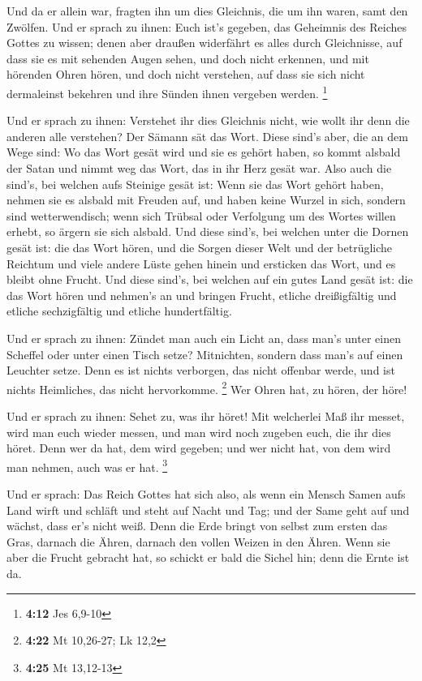  Und da er allein war, fragten ihn um dies Gleichnis, die
um ihn waren, samt den Zwölfen.  Und er sprach zu ihnen:
Euch ist's gegeben, das Geheimnis des Reiches Gottes zu wissen; denen
aber draußen widerfährt es alles durch Gleichnisse,  auf
dass sie es mit sehenden Augen sehen, und doch nicht erkennen, und mit
hörenden Ohren hören, und doch nicht verstehen, auf dass sie sich nicht
dermaleinst bekehren und ihre Sünden ihnen vergeben werden. \footnote{\textbf{4:12}
  Jes 6,9-10}

 Und er sprach zu ihnen: Verstehet ihr dies Gleichnis
nicht, wie wollt ihr denn die anderen alle verstehen?  Der
Sämann sät das Wort.  Diese sind's aber, die an dem Wege
sind: Wo das Wort gesät wird und sie es gehört haben, so kommt alsbald
der Satan und nimmt weg das Wort, das in ihr Herz gesät war.
 Also auch die sind's, bei welchen aufs Steinige gesät ist:
Wenn sie das Wort gehört haben, nehmen sie es alsbald mit Freuden auf,
 und haben keine Wurzel in sich, sondern sind
wetterwendisch; wenn sich Trübsal oder Verfolgung um des Wortes willen
erhebt, so ärgern sie sich alsbald.  Und diese sind's, bei
welchen unter die Dornen gesät ist: die das Wort hören, 
und die Sorgen dieser Welt und der betrügliche Reichtum und viele andere
Lüste gehen hinein und ersticken das Wort, und es bleibt ohne Frucht.
 Und diese sind's, bei welchen auf ein gutes Land gesät
ist: die das Wort hören und nehmen's an und bringen Frucht, etliche
dreißigfältig und etliche sechzigfältig und etliche hundertfältig.

 Und er sprach zu ihnen: Zündet man auch ein Licht an, dass
man's unter einen Scheffel oder unter einen Tisch setze? Mitnichten,
sondern dass man's auf einen Leuchter setze.  Denn es ist
nichts verborgen, das nicht offenbar werde, und ist nichts Heimliches,
das nicht hervorkomme. \footnote{\textbf{4:22} Mt 10,26-27; Lk 12,2}
 Wer Ohren hat, zu hören, der höre!

 Und er sprach zu ihnen: Sehet zu, was ihr höret! Mit
welcherlei Maß ihr messet, wird man euch wieder messen, und man wird
noch zugeben euch, die ihr dies höret.  Denn wer da hat,
dem wird gegeben; und wer nicht hat, von dem wird man nehmen, auch was
er hat. \footnote{\textbf{4:25} Mt 13,12-13}

 Und er sprach: Das Reich Gottes hat sich also, als wenn
ein Mensch Samen aufs Land wirft  und schläft und steht auf
Nacht und Tag; und der Same geht auf und wächst, dass er's nicht weiß.
 Denn die Erde bringt von selbst zum ersten das Gras,
darnach die Ähren, darnach den vollen Weizen in den Ähren. 
Wenn sie aber die Frucht gebracht hat, so schickt er bald die Sichel
hin; denn die Ernte ist da.

